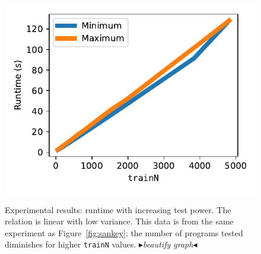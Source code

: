 \documentclass[acmlarge, manuscript, screen, review, anonymous, table]{acmart}
\newcommand{\mynote}[2]
    {{\color{red} \fbox{\bfseries\sffamily\scriptsize#1}
    {\small$\blacktriangleright$\textsf{\emph{#2}}$\blacktriangleleft$}}~}
\newcommand{\todo}[1]{\mynote{TODO}{#1}}
\begin{document}
\begin{figure}[tbhp]
  \newcommand{\gsize}{.38\textwidth}
  \includegraphics[width=\gsize]{graphs/asymptote_time.pdf} \\
  \caption{Experimental results: runtime with increasing test power. The relation is linear with low variance.
           This data is from the same experiment as Figure~\ref{fig:sankey};
           the number of programs tested diminishes for higher \texttt{trainN} values.
           \todo{beautify graph}
           }
  \label{fig:linear-time}
\end{figure}
\end{document}
